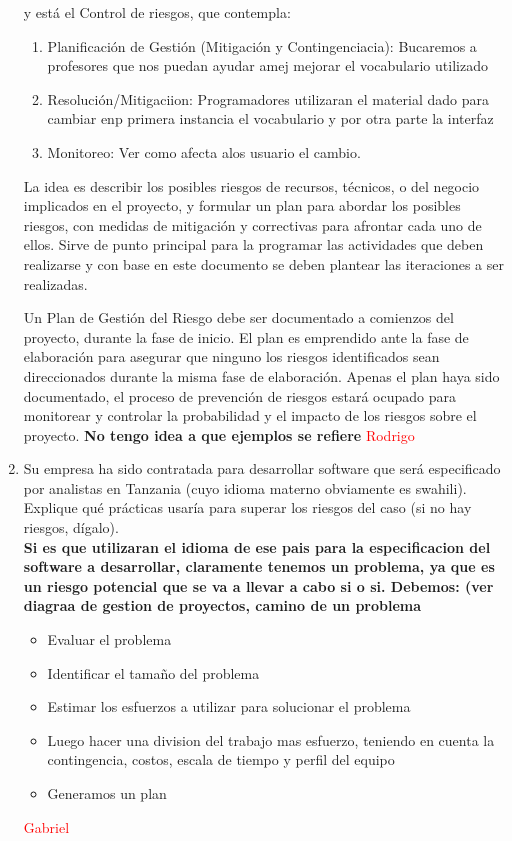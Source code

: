 \begin{enumerate}
y está el Control de riesgos, que contempla:
\begin{enumerate}
	\item Planificación de Gestión (Mitigación y Contingenciacia): Bucaremos a profesores que nos puedan ayudar amej mejorar el vocabulario utilizado
	\item Resolución/Mitigaciion: Programadores utilizaran el material dado para cambiar enp primera instancia el vocabulario y por otra parte la interfaz
	\item Monitoreo: Ver como afecta alos usuario el cambio.
\end{enumerate}

La idea es describir los posibles riesgos de recursos, técnicos, o del negocio implicados en
el proyecto, y formular un plan para abordar los posibles riesgos, con medidas de mitigación y correctivas
para afrontar cada uno de ellos. Sirve de punto principal para la programar las actividades que deben
realizarse y con base en este documento se deben plantear las iteraciones a ser realizadas.

Un Plan de Gestión del Riesgo debe ser documentado a comienzos del proyecto, durante la fase de inicio.
El plan es emprendido ante la fase de elaboración para asegurar que ninguno los riesgos identificados
sean direccionados durante la misma fase de elaboración. Apenas el plan haya sido documentado, el proceso
de prevención de riesgos estará ocupado para monitorear y controlar la probabilidad y el impacto de los
riesgos sobre el proyecto. 
\textbf{No tengo idea a que ejemplos se refiere}
	\textcolor{red}{Rodrigo}

	\item Su empresa ha sido contratada para desarrollar software que será especificado por analistas en Tanzania (cuyo idioma materno obviamente es swahili). Explique qué prácticas usaría para superar los riesgos del caso (si no hay riesgos, dígalo).\\
	\textbf{Si es que utilizaran el idioma de ese pais para la especificacion del software a desarrollar, claramente tenemos un problema, ya que es un riesgo potencial que se va a llevar a cabo si o si. Debemos: (ver diagraa de gestion de proyectos, camino de un problema}
	\begin{itemize}
	\item Evaluar el problema
	\item Identificar el tama\~no del problema
	\item Estimar los esfuerzos a utilizar para solucionar el problema
	\item Luego hacer una division del trabajo mas esfuerzo, teniendo en cuenta la contingencia, costos, escala de tiempo y perfil del equipo
	\item Generamos un plan
	\end{itemize}
	\textcolor{red}{Gabriel}


\end{enumerate}

